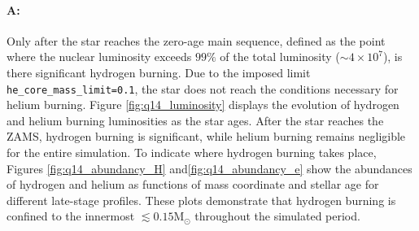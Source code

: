\documentclass[twocolumn,fontsize=11pt]{scrartcl}
\begin{document}
\paragraph{A:} Only after the star reaches the zero-age main sequence, defined as the point where the nuclear luminosity exceeds \(99\%\) of the total luminosity (\(\sim 4 \times 10^7\)), is there significant hydrogen burning. Due to the imposed limit \texttt{he\_core\_mass\_limit=0.1}, the star does not reach the conditions necessary for helium burning. 
Figure \ref{fig:q14_luminosity} displays the evolution of hydrogen and helium burning luminosities as the star ages. After the star reaches the ZAMS, hydrogen burning is significant, while helium burning remains negligible for the entire simulation. To indicate where hydrogen burning takes place, Figures \ref{fig:q14_abundancy_H} and\ref{fig:q14_abundancy_e} show the abundances of hydrogen and helium as functions of mass coordinate and stellar age for different late-stage profiles. These plots demonstrate that hydrogen burning is confined to the innermost \(\lesssim 0.15 \text{M}_\odot\)  throughout the simulated period.
\end{document}
